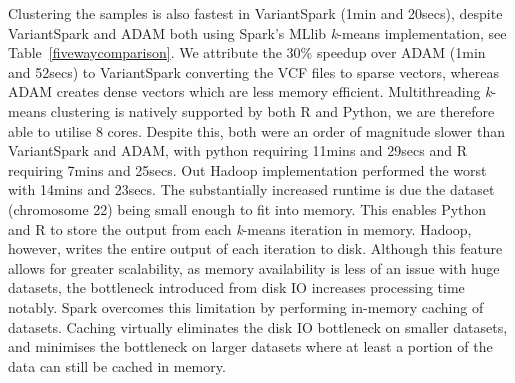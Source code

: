 \documentclass{bmcart}
\newcommand{\variantSpark}{{\sc VariantSpark}}
\newcommand{\kMeans}{\textit{k}-means}
\begin{document}
Clustering the samples is also fastest in \variantSpark{} (1min and 20secs), despite \variantSpark{} and ADAM both using {\sc Spark}'s MLlib \kMeans{} implementation, see Table~\ref{fivewaycomparison}.
We attribute the 30\% speedup over ADAM (1min and 52secs) to \variantSpark{} converting the VCF files to sparse vectors, whereas ADAM creates dense vectors which are less memory efficient.
Multithreading \kMeans{} clustering is natively supported by both R and Python, we are therefore able to utilise 8 cores. 
Despite this, both were an order of magnitude slower than \variantSpark{} and ADAM, with python requiring 11mins and 29secs and R requiring 7mins and 25secs.
Out Hadoop implementation performed the worst with 14mins and 23secs.
The substantially increased runtime is due the dataset (chromosome 22) being small enough to fit into memory. This enables Python and R to store the output from each \kMeans{} iteration in memory. Hadoop, however, writes the entire output of each iteration to disk.
Although this feature allows for greater scalability, as memory availability is less of an issue with huge datasets, the bottleneck introduced from disk IO increases processing time notably.
{\sc Spark} overcomes this limitation by performing in-memory caching of datasets. Caching virtually eliminates the disk IO bottleneck on smaller datasets, and minimises the bottleneck on larger datasets where at least a portion of the data can still be cached in memory.


\end{document}
